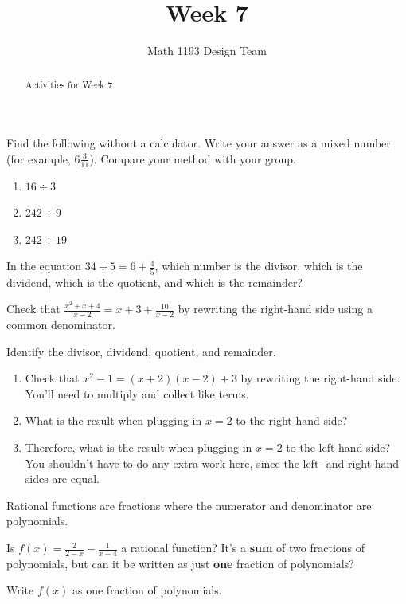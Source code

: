 \documentclass[noauthor]{ximera}
\title{Week 7}
\author{Math 1193 Design Team}
\begin{document}
\begin{abstract}
    Activities for Week 7.
\end{abstract}
\maketitle

\begin{problem}
Find the following without a calculator. Write your answer as a 
mixed number (for example, \(6 \frac{3}{11}\)). Compare your method 
with your group.

\begin{enumerate}
    \item \(16 \div 3\)
    \item \(242 \div 9\)
    \item \(242 \div 19\)
\end{enumerate}
\end{problem}

\begin{problem}
In the equation \(34 \div 5 = 6 + \frac{4}{5}\), which number
is the divisor, which is the dividend, which is the quotient, and 
which is the remainder?
\end{problem}

\begin{problem}
Check that \(\frac{x^2 + x + 4}{x - 2} = x + 3 + \frac{10}{x - 2}\) by
rewriting the right-hand side using a common denominator. 

Identify the divisor, dividend, quotient, and remainder.

\end{problem}

\begin{problem}
\begin{enumerate}
    \item Check that \(x^2 - 1 = (x + 2)(x - 2) + 3\) by rewriting the right-hand
    side. You'll need to multiply and collect like terms.
    \item What is the result when plugging in \(x = 2\) to the right-hand side?
    \item Therefore, what is the result when plugging in \(x = 2\) to the left-hand
    side? You shouldn't have to do any extra work here, since the
    left- and right-hand sides are equal.
\end{enumerate}

\end{problem}

\begin{problem}
Rational functions are fractions where the numerator and
denominator are polynomials.

Is \(f(x) = \frac{2}{2 - x} - \frac{1}{x - 4}\) a rational function?
It's a \textbf{sum} of two fractions of polynomials, but can it be
written as just \textbf{one} fraction of polynomials?

Write \(f(x)\) as one fraction of polynomials.
\end{problem}
\end{document}
